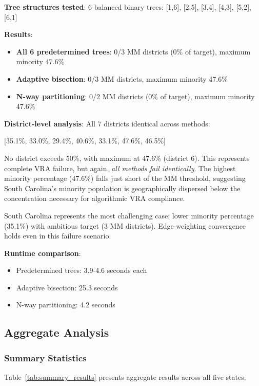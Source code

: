 \textbf{Tree structures tested}: 6 balanced binary trees: [1,6], [2,5], [3,4], [4,3], [5,2], [6,1]

\textbf{Results}:
\begin{itemize}
\item \textbf{All 6 predetermined trees}: 0/3 MM districts (0\% of target), maximum minority 47.6\%
\item \textbf{Adaptive bisection}: 0/3 MM districts, maximum minority 47.6\%
\item \textbf{N-way partitioning}: 0/2 MM districts (0\% of target), maximum minority 47.6\%
\end{itemize}

\textbf{District-level analysis}: All 7 districts identical across methods:
\begin{center}
[35.1\%, 33.0\%, 29.4\%, 40.6\%, 33.1\%, 47.6\%, 46.5\%]
\end{center}

No district exceeds 50\%, with maximum at 47.6\% (district 6). This represents complete VRA failure, but again, \textit{all methods fail identically}. The highest minority percentage (47.6\%) falls just short of the MM threshold, suggesting South Carolina's minority population is geographically dispersed below the concentration necessary for algorithmic VRA compliance.

South Carolina represents the most challenging case: lower minority percentage (35.1\%) with ambitious target (3 MM districts). Edge-weighting convergence holds even in this failure scenario.

\textbf{Runtime comparison}:
\begin{itemize}
\item Predetermined trees: 3.9-4.6 seconds each
\item Adaptive bisection: 25.3 seconds
\item N-way partitioning: 4.2 seconds
\end{itemize}

\subsection{Aggregate Analysis}

\subsubsection{Summary Statistics}

Table~\ref{tab:summary_results} presents aggregate results across all five states:

